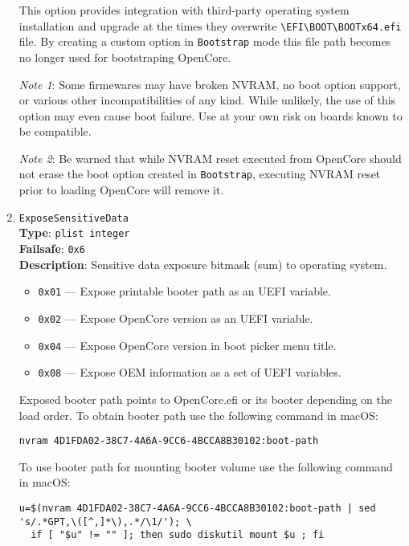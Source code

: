\documentclass[]{article}
\providecommand{\tightlist}{%
  \setlength{\itemsep}{0pt}\setlength{\parskip}{0pt}}
\begin{document}
\begin{enumerate}
  This option provides integration with third-party operating system installation and upgrade
  at the times they overwrite \texttt{\textbackslash EFI\textbackslash BOOT\textbackslash BOOTx64.efi}
  file. By creating a custom option in \texttt{Bootstrap} mode this file path becomes no longer
  used for bootstraping OpenCore.

  \emph{Note 1}: Some firmewares may have broken NVRAM, no boot option support, or various other
  incompatibilities of any kind. While unlikely, the use of this option may even cause boot failure.
  Use at your own risk on boards known to be compatible.

  \emph{Note 2}: Be warned that while NVRAM reset executed from OpenCore should not erase the boot
  option created in \texttt{Bootstrap}, executing NVRAM reset prior to loading OpenCore will remove it.

\item
  \texttt{ExposeSensitiveData}\\
  \textbf{Type}: \texttt{plist\ integer}\\
  \textbf{Failsafe}: \texttt{0x6}\\
  \textbf{Description}: Sensitive data exposure bitmask (sum) to operating system.

  \begin{itemize}
  \tightlist
    \item \texttt{0x01} --- Expose printable booter path as an UEFI variable.
    \item \texttt{0x02} --- Expose OpenCore version as an UEFI variable.
    \item \texttt{0x04} --- Expose OpenCore version in boot picker menu title.
    \item \texttt{0x08} --- Expose OEM information as a set of UEFI variables.
  \end{itemize}

  Exposed booter path points to OpenCore.efi or its booter depending on the load order.
  To obtain booter path use the following command in macOS:
\begin{lstlisting}[label=nvrampath, style=ocbash]
nvram 4D1FDA02-38C7-4A6A-9CC6-4BCCA8B30102:boot-path
\end{lstlisting}

  To use booter path for mounting booter volume use the following command in macOS:
\begin{lstlisting}[label=nvrampathmount, style=ocbash]
u=$(nvram 4D1FDA02-38C7-4A6A-9CC6-4BCCA8B30102:boot-path | sed 's/.*GPT,\([^,]*\),.*/\1/'); \
  if [ "$u" != "" ]; then sudo diskutil mount $u ; fi
\end{lstlisting}


\end{enumerate}
\end{document}
